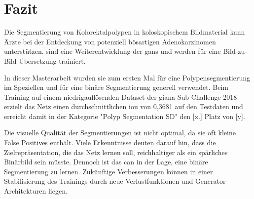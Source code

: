 \chapter{Fazit}

Die Segmentierung von Kolorektalpolypen in koloskopischem Bildmaterial kann Ärzte bei der Entdeckung von potenziell bösartigen Adenokarzinomen unterstützen.
 sind eine Weiterentwicklung der \glspl{gan} und werden für eine Bild-zu-Bild-Übersetzung trainiert.

In dieser Masterarbeit wurden sie zum ersten Mal für eine Polypensegmentierung im Speziellen und für eine binäre Segmentierung generell verwendet.
Beim Training auf einem niedrigauflösenden Dataset der \gls{giana} Sub-Challenge 2018 erzielt das Netz einen durchschnittlichen \gls{iou} von 0,3681 auf den Testdaten und erreicht damit in der Kategorie "Polyp Segmentation SD" den [x.] Platz von [y].

Die visuelle Qualität der Segmentierungen ist nicht optimal, da sie oft kleine False Positives enthält.
Viele Erkenntnisse deuten darauf hin, dass die Zielrepräsentation, die das Netz lernen soll, reichhaltiger als ein spärliches Binärbild sein müsste.
Dennoch ist das \gls{can} in der Lage, eine binäre Segmentierung zu lernen.
Zukünftige Verbesserungen können in einer Stabilisierung des Trainings durch neue Verlustfunktionen und Generator-Architekturen liegen.
